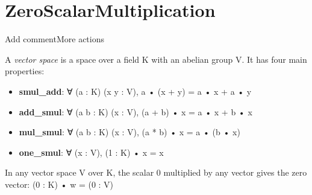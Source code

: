 \section{ZeroScalarMultiplication}Add commentMore actions

\begin{definition}
  \leanok
  A \emph{vector space} is a space over a field K with an abelian group V. It has four main properties:
  \begin{itemize}
    \item \textbf{smul\_add}:
    ∀ (a : K) (x y : V), a • (x + y) = a • x + a • y
    \item \textbf{add\_smul}:
    ∀ (a b : K) (x : V), (a + b) • x = a • x + b • x
    \item \textbf{mul\_smul}:
    ∀ (a b : K) (x : V), (a * b) • x = a • (b • x)
    \item \textbf{one\_smul}:
    ∀ (x : V), (1 : K) • x = x
  \end{itemize}
\end{definition}

\begin{theorem}
  \label{theorem : zero_smul_v}
  \leanok
  In any vector space V over K, the scalar 0 multiplied by any vector gives the zero vector: (0 : K) • w = (0 : V)
\end{theorem}
